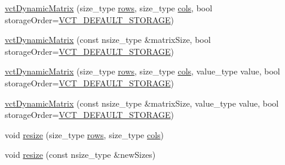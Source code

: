 \begin{DoxyCompactItemize}
\item 
\hyperlink{classvct_dynamic_matrix_ae693edccbffb21855743074d733647c4}{vct\-Dynamic\-Matrix} (size\-\_\-type \hyperlink{classvct_dynamic_const_matrix_base_a5eac13be2207ebeb8766cde379d73438}{rows}, size\-\_\-type \hyperlink{classvct_dynamic_const_matrix_base_aa6c51d41a100da49a7e7ac7edb20ecd9}{cols}, bool storage\-Order=\hyperlink{vct_forward_declarations_8h_aacdb3b0140beef8a3c2025b808b74a73}{V\-C\-T\-\_\-\-D\-E\-F\-A\-U\-L\-T\-\_\-\-S\-T\-O\-R\-A\-G\-E})
\item 
\hyperlink{classvct_dynamic_matrix_a108e3e9ede047d49e714c30a7eea4807}{vct\-Dynamic\-Matrix} (const nsize\-\_\-type \&matrix\-Size, bool storage\-Order=\hyperlink{vct_forward_declarations_8h_aacdb3b0140beef8a3c2025b808b74a73}{V\-C\-T\-\_\-\-D\-E\-F\-A\-U\-L\-T\-\_\-\-S\-T\-O\-R\-A\-G\-E})
\end{DoxyCompactItemize}

{\bf }\par
\begin{DoxyCompactItemize}
\item 
\hyperlink{classvct_dynamic_matrix_ae76b313f74cb7444e8b43a2d55a3378d}{vct\-Dynamic\-Matrix} (size\-\_\-type \hyperlink{classvct_dynamic_const_matrix_base_a5eac13be2207ebeb8766cde379d73438}{rows}, size\-\_\-type \hyperlink{classvct_dynamic_const_matrix_base_aa6c51d41a100da49a7e7ac7edb20ecd9}{cols}, value\-\_\-type value, bool storage\-Order=\hyperlink{vct_forward_declarations_8h_aacdb3b0140beef8a3c2025b808b74a73}{V\-C\-T\-\_\-\-D\-E\-F\-A\-U\-L\-T\-\_\-\-S\-T\-O\-R\-A\-G\-E})
\item 
\hyperlink{classvct_dynamic_matrix_abf3c0073adb839af415346daa49f4fe2}{vct\-Dynamic\-Matrix} (const nsize\-\_\-type \&matrix\-Size, value\-\_\-type value, bool storage\-Order=\hyperlink{vct_forward_declarations_8h_aacdb3b0140beef8a3c2025b808b74a73}{V\-C\-T\-\_\-\-D\-E\-F\-A\-U\-L\-T\-\_\-\-S\-T\-O\-R\-A\-G\-E})
\end{DoxyCompactItemize}

{\bf }\par
\begin{DoxyCompactItemize}
\item 
void \hyperlink{classvct_dynamic_matrix_a19c796adf2f314ce0f45be1c47c01581}{resize} (size\-\_\-type \hyperlink{classvct_dynamic_const_matrix_base_a5eac13be2207ebeb8766cde379d73438}{rows}, size\-\_\-type \hyperlink{classvct_dynamic_const_matrix_base_aa6c51d41a100da49a7e7ac7edb20ecd9}{cols})
\item 
void \hyperlink{classvct_dynamic_matrix_a3bbbede5887b2ac73294ced2e516d72a}{resize} (const nsize\-\_\-type \&new\-Sizes)
\end{DoxyCompactItemize}

